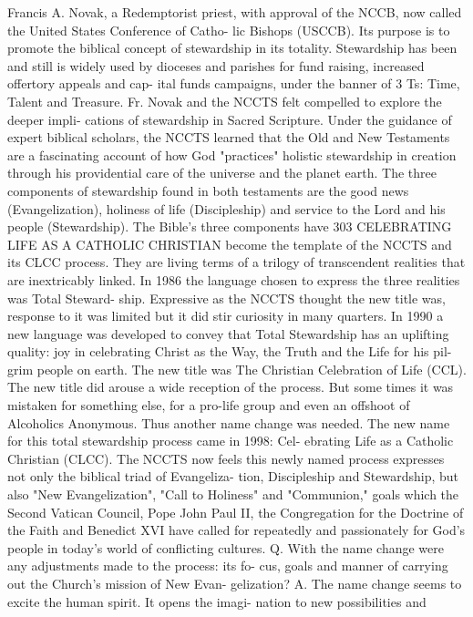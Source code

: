 \documentclass[oneside]{book}
\begin{document}
Francis A. Novak, a Redemptorist priest, with approval of the NCCB, now called
the United States Conference of Catho- lic Bishops (USCCB). Its purpose is to
promote the biblical concept of stewardship in its totality. Stewardship has
been and still is widely used by dioceses and parishes for fund raising,
increased offertory appeals and cap- ital funds campaigns, under the banner of 3
Ts: Time, Talent and Treasure.  Fr. Novak and the NCCTS felt compelled to
explore the deeper impli- cations of stewardship in Sacred Scripture. Under the
guidance of expert biblical scholars, the NCCTS learned that the Old and New
Testaments are a fascinating account of how God "practices" holistic stewardship
in creation through his providential care of the universe and the planet
earth. The three components of stewardship found in both testaments are the good
news (Evangelization), holiness of life (Discipleship) and service to the Lord
and his people (Stewardship). The Bible's three components have 303 CELEBRATING
LIFE AS A CATHOLIC CHRISTIAN become the template of the NCCTS and its CLCC
process. They are living terms of a trilogy of transcendent realities that are
inextricably linked. In 1986 the language chosen to express the three realities
was Total Steward- ship.  Expressive as the NCCTS thought the new title was,
response to it was limited but it did stir curiosity in many quarters. In 1990 a
new language was developed to convey that Total Stewardship has an uplifting
quality: joy in celebrating Christ as the Way, the Truth and the Life for his
pil- grim people on earth. The new title was The Christian Celebration of Life
(CCL). The new title did arouse a wide reception of the process. But some times
it was mistaken for something else, for a pro-life group and even an offshoot of
Alcoholics Anonymous. Thus another name change was needed.  The new name for
this total stewardship process came in 1998: Cel- ebrating Life as a Catholic
Christian (CLCC). The NCCTS now feels this newly named process expresses not
only the biblical triad of Evangeliza- tion, Discipleship and Stewardship, but
also "New Evangelization", "Call to Holiness" and "Communion," goals which the
Second Vatican Council, Pope John Paul II, the Congregation for the Doctrine of
the Faith and Benedict XVI have called for repeatedly and passionately for God's
people in today's world of conflicting cultures.  Q. With the name change were
any adjustments made to the process: its fo- cus, goals and manner of carrying
out the Church's mission of New Evan- gelization?  A. The name change seems to
excite the human spirit. It opens the imagi- nation to new possibilities and
\end{document}

